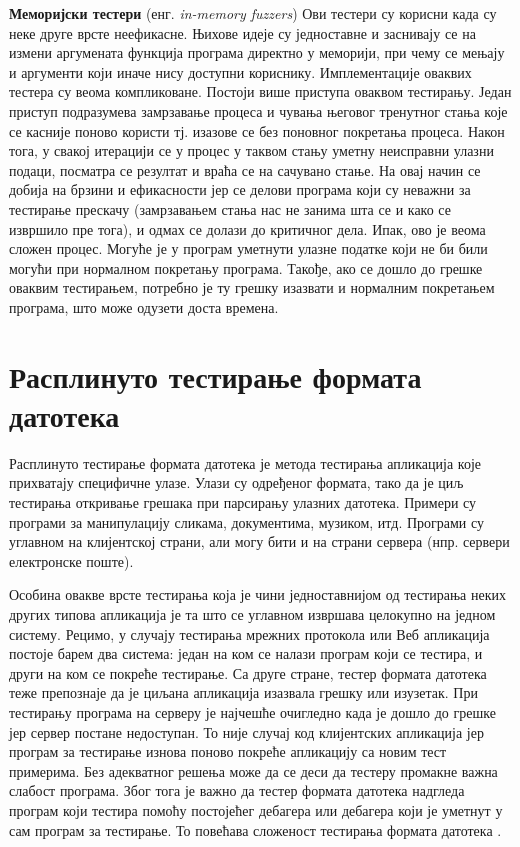 \documentclass[12pt,oneside]{memoir}
\begin{document}
\begin{description}
\item \textbf{Меморијски тестери} (енг. \textit{in-memory fuzzers}) Ови тестери су корисни када су неке друге врсте неефикасне. Њихове идеје су једноставне и заснивају се на измени аргумената функција програма директно у меморији, при чему се мењају и аргументи који иначе нису доступни кориснику. Имплементације оваквих тестера су веома компликоване. Постоји више приступа оваквом тестирању. Један приступ подразумева замрзавање процеса и чувања његовог тренутног стања које се касније поново користи тј. изазове се без поновног покретања процеса. Након тога, у свакој итерацији се у процес у таквом стању уметну неисправни улазни подаци, посматра се резултат и враћа се на сачувано стање. На овај начин се добија на брзини и ефикасности јер се делови програма који су неважни за тестирање прескачу (замрзавањем стања нас не занима шта се и како се извршило пре тога), и одмах се долази до критичног дела. Ипак, ово је веома сложен процес. Могуће је у програм уметнути улазне податке који не би били могући при нормалном покретању програма. Такође, ако се дошло до грешке оваквим тестирањем, потребно је ту грешку изазвати и нормалним покретањем програма, што може одузети доста времена.
\end{description}

\section{Расплинуто тестирање формата датотека}
\label{sec:rasTestFormFajl}

Расплинуто тестирање формата датотека  је метода тестирања апликација које прихватају специфичне улазе. Улази су одређеног формата, тако да је циљ тестирања откривање грешака при парсирању улазних датотека. Примери су програми за манипулацију сликама, документима, музиком, итд. Програми су углавном на клијентској страни, али могу бити и на страни сервера (нпр. сервери електронске поште).

Особина овакве врсте тестирања која је чини једноставнијом од тестирања неких других типова апликација је та што се углавном извршава целокупно на једном систему. Рецимо, у случају  тестирања мрежних протокола или Веб апликација постоје барем два система: један на ком се налази програм који се тестира, и други на ком се покреће тестирање. Са друге стране, тестер формата датотека теже препознаје да је циљана апликација изазвала грешку или изузетак. При тестирању програма на серверу је најчешће очигледно када је дошло до грешке јер сервер постане недоступан. То није случај код клијентских апликација јер програм за тестирање изнова поново покреће апликацију са новим тест примерима. Без адекватног решења може да се деси да тестеру промакне важна слабост програма. Због тога је важно да тестер формата датотека надгледа програм који тестира помоћу постојећег дебагера или дебагера који је уметнут у сам програм за тестирање. То повећава сложеност тестирања формата датотека \cite{fuzzingBrute, fuzzing}.
\end{document}
